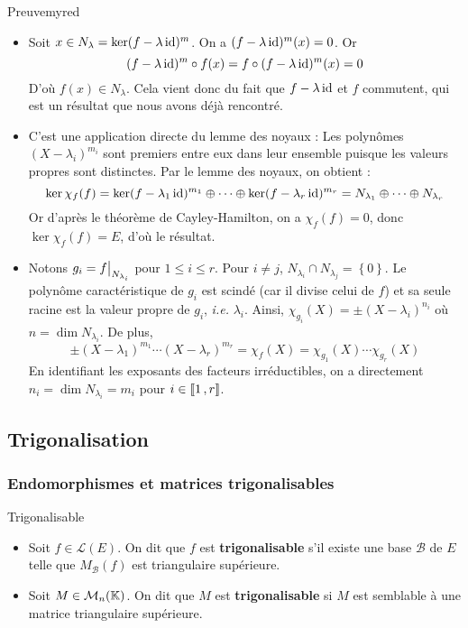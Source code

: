     \begin{demo}{Preuve}{myred}
        \begin{itemize}
            \item Soit $x \in N_{\lambda} = \ker(f - \lambda \operatorname{id})^m$. On a $(f - \lambda \operatorname{id})^m(x) = 0$. Or 
            \[ (f - \lambda \operatorname{id})^m \circ f(x) = f \circ (f - \lambda \operatorname{id})^m (x) = 0 \]   
            D’où $f(x) \in N_{\lambda}$. Cela vient donc du fait que $f - \lambda \operatorname{id}$ et $f$ commutent, qui est un résultat que nous avons déjà rencontré.
            \item C’est une application directe du lemme des noyaux : Les polynômes $(X - \lambda_i)^{m_i}$ sont premiers entre eux dans leur ensemble puisque les valeurs propres sont distinctes. Par le lemme des noyaux, on obtient : 
            \[ \ker \chi_f(f) = \ker(f - \lambda_1 \operatorname{id})^{m_1} \oplus \cdots \oplus \ker(f - \lambda_r \operatorname{id})^{m_r} = N_{\lambda_1} \oplus \cdots \oplus N_{\lambda_r} \]    
            Or d’après le théorème de Cayley-Hamilton, on a $\chi_f(f) = 0$, donc $\ker \chi_f(f) = E$, d’où le résultat.
            \item Notons $g_i = \restr{f}{N_{\lambda_i}}$ pour $1 \leq i \leq r$. Pour $i \neq j$, $N_{\lambda_i} \cap N_{\lambda_j} = \left\{0\right\}$. Le polynôme caractéristique de $g_i$ est scindé (car il divise celui de $f$) et sa seule racine est la valeur propre de $g_i$, \textit{i.e.} $\lambda_i$. Ainsi, $\chi_{g_i} (X) = \pm (X - \lambda_i)^{n_i}$ où $n = \dim N_{\lambda_i}$. De plus, 
            \[ \pm (X - \lambda_1)^{m_1} \cdots (X - \lambda_r)^{m_r} = \chi_f(X) = \chi_{g_1}(X) \cdots \chi_{g_r}(X) \]    
            En identifiant les exposants des facteurs irréductibles, on a directement $n_i = \dim N_{\lambda_i} = m_i$ pour $i \in \left\llbracket 1 \, , r \right\rrbracket$.
        \end{itemize}
    \end{demo}

\subsection{Trigonalisation}    

    \subsubsection{Endomorphismes et matrices trigonalisables}

    \begin{defi}{Trigonalisable}{}
        \begin{itemize}
            \item Soit $f \in \mathcal{L}(E)$. On dit que $f$ est \textbf{trigonalisable} s’il existe une base $\mathcal{B}$ de $E$ telle que $M_{\mathcal{B}}(f)$ est triangulaire supérieure.
            \item Soit $M \in \mathcal{M}_{n}(\mathbb{K})$. On dit que $M$ est \textbf{trigonalisable} si $M$ est semblable à une matrice triangulaire supérieure.
        \end{itemize}
    \end{defi}

